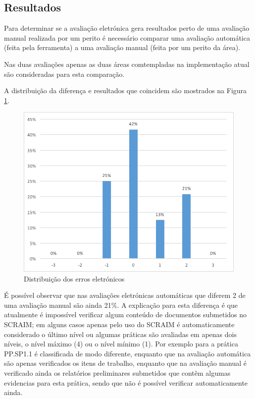 \documentclass[9pt,a4paper]{extarticle}
\begin{document}
\begin{multicols}{2}
\subsection{Resultados}
Para determinar se a avaliação eletrónica gera resultados perto de uma avaliação manual realizada por um perito é necessário comparar uma avaliação automática (feita pela ferramenta) a uma avaliação manual (feita por um perito da área).

Nas duas avaliações apenas as duas áreas comtempladas na implementação atual são consideradas para esta comparação.

A distribuição da diferença e resultados que coincidem são mostrados na Figura
 \ref{fig:figura2}.

\begin{figure}[H]
	\centerline{\includegraphics[scale=.5]{delta.png}}
	\caption{Distribuição dos erros eletrónicos}  
	\label{fig:figura2}
\end{figure}


É possível observar que nas avaliações eletrónicas automáticas que diferem 2 de uma avaliação manual são ainda 21\%.
A explicação para esta diferença é que atualmente é impossível verificar algum conteúdo de documentos submetidos no SCRAIM; em alguns casos apenas pelo uso do SCRAIM é automaticamente considerado o último nível ou algumas práticas são avaliadas em apenas dois níveis, o nível máximo (4) ou o nível mínimo (1). Por exemplo para a prática PP.SP1.1 é classificada de modo diferente, enquanto que na avaliação automática são apenas verificados os itens de trabalho, enquanto que na avaliação manual é verificado ainda os relatórios preliminares submetidos que contêm algumas evidencias para esta prática, sendo que não é possível verificar automaticamente ainda.


\end{multicols}
\end{document}
